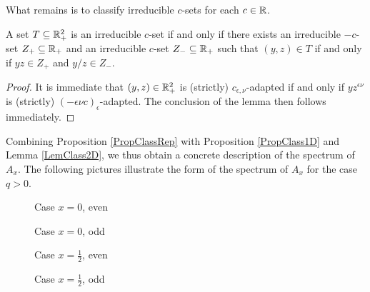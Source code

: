 What remains is to classify irreducible $c$-sets for each $c\in \mathbb{R}$. 

\begin{Lem}\label{LemClass2D} A set $T\subseteq \mathbb{R}_+^2$ is an irreducible $c$-set if and only if there exists an irreducible $-c$-set $Z_+\subseteq \mathbb{R}_+$ and an irreducible $c$-set $Z_-\subseteq \mathbb{R}_+$ such that $(y,z)\in T$ if and only if $yz\in Z_+$ and $y/z\in Z_-$.
\end{Lem} 

\begin{proof} It is immediate that $(y,z)\in \mathbb{R}_+^2$ is (strictly) $c_{\epsilon,\nu}$-adapted if and only if $yz^{\epsilon\nu}$ is (strictly) $(-\epsilon\nu c)_{\epsilon}$-adapted. The conclusion of the lemma then follows immediately.
\end{proof}

Combining Proposition \ref{PropClassRep} with Proposition \ref{PropClass1D} and Lemma \ref{LemClass2D}, we thus obtain a concrete description of the spectrum of $A_x$. The following pictures illustrate the form of the spectrum of $A_x$ for the case $q>0$.

\begin{figure}[h]
  \centering

  \caption{Case $x=0$, even}
\label{figy}
\end{figure}

\begin{figure}[h]
  \centering

  \caption{Case $x=0$, odd}
\label{figy}
\end{figure}


\begin{figure}[h]
  \centering

  \caption{Case $x=\frac{1}{2}$, even}
\label{figy}
\end{figure}


\begin{figure}[h]
  \centering
  
  
  \caption{Case $x=\frac{1}{2}$, odd}
\label{figy}
\end{figure}

%






